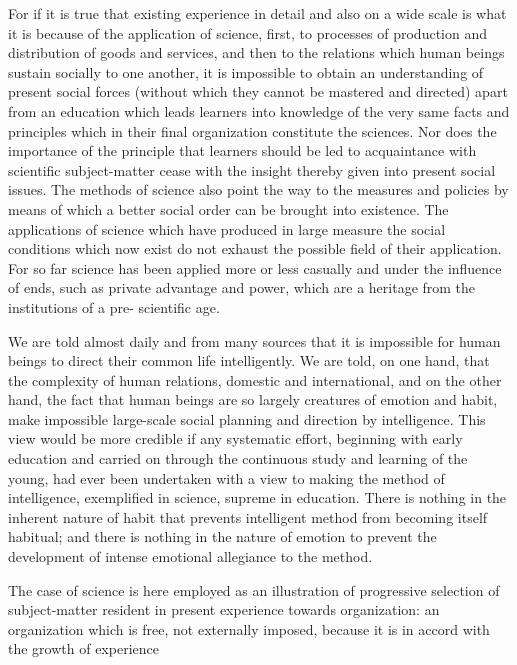 For if it is true that existing experience in detail and also on a wide scale is what it is 
because of the application of science, first, to processes of production and distribution of 
goods and services, and then to the relations which human beings sustain socially to one 
another, it is impossible to obtain an understanding of present social forces (without 
which they cannot be mastered and directed) apart from an education which leads 
learners into knowledge of the very same facts and principles which in their final 
organization constitute the sciences. Nor does the importance of the principle that 
learners should be led to acquaintance with scientific subject-matter cease with the 
insight thereby given into present social issues. The methods of science also point the 
way to the measures and policies by means of which a better social order can be brought 
into existence. The applications of science which have produced in large measure the 
social conditions which now exist do not exhaust the possible field of their application. 
For so far science has been applied more or less casually and under the influence of ends, 
such as private advantage and power, which are a heritage from the institutions of a pre- 
scientific age. 

We are told almost daily and from many sources that it is impossible for human beings 
to direct their common life intelligently. We are told, on one hand, that the complexity of 
human relations, domestic and international, and on the other hand, the fact that human 
beings are so largely creatures of emotion and habit, make impossible large-scale social 
planning and direction by intelligence. This view would be more credible if any 
systematic effort, beginning with early education and carried on through the continuous 
study and learning of the young, had ever been undertaken with a view to making the 
method of intelligence, exemplified in science, supreme in education. There is nothing in 
the inherent nature of habit that prevents intelligent method from becoming itself 
habitual; and there is nothing in the nature of emotion to prevent the development of 
intense emotional allegiance to the method. 

The case of science is here employed as an illustration of progressive selection of 
subject-matter resident in present experience towards organization: an organization which 
is free, not externally imposed, because it is in accord with the growth of experience 



